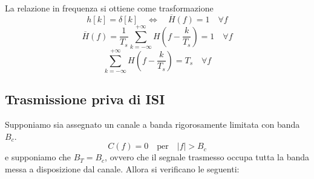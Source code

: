 \documentclass{article}
\begin{document}
La relazione in frequenza si ottiene come trasformazione
\[ h[k] = \delta[k] \quad \Longleftrightarrow \quad \overline{H}(f) = 1 \quad \forall f \]
\[ \overline{H}(f) = \frac{1}{T_s} \sum_{k=-\infty}^{+\infty} H\left(f - \frac{k}{T_s}\right) = 1 \quad \forall f \]
\[ \sum_{k=-\infty}^{+\infty} H\left(f - \frac{k}{T_s}\right) = T_s \quad \forall f \]

\subsection*{Trasmissione priva di ISI}
Supponiamo sia assegnato un canale a banda rigorosamente limitata con banda \( B_c \).
\[ C(f) = 0 \quad \text{per} \quad |f| > B_c \]
e supponiamo che \( B_T = B_c \), ovvero che il segnale trasmesso occupa tutta la banda messa a disposizione dal canale.
Allora si verificano le seguenti:
\end{document}
